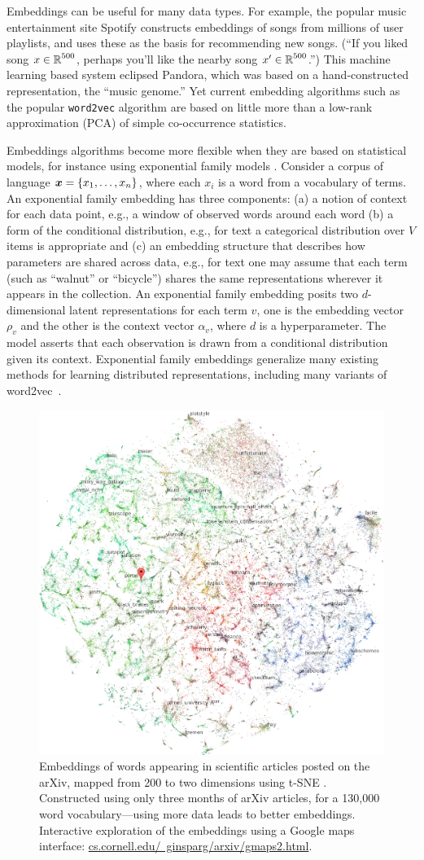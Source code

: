 Embeddings can be useful for many data types. For example, the popular
music entertainment site Spotify constructs embeddings of songs from
millions of user playlists, and uses these as the basis for
recommending new songs.  (``If you liked song $x\in\mbox{$\mathbb{R}$}^{500}$,
perhaps you'll like the nearby song $x'\in\mbox{$\mathbb{R}$}^{500}$.'')  This
machine learning based system eclipsed Pandora, which was based on a
hand-constructed representation, the ``music genome.'' Yet current
embedding algorithms such as the popular \texttt{word2vec} algorithm
are based on little more than a low-rank approximation (PCA) of simple
co-occurrence statistics.

Embeddings algorithms become more flexible when they are based
on statistical models, for instance using exponential family
models \citep{Rudolph:2016b,spherical}.
Consider a corpus of language $\boldsymbol{x} = \{x_1, \ldots, x_n\}$, where
each $x_i$ is a word from a vocabulary of terms. An exponential family
embedding has three components: (a) a notion of context for
each data point, e.g., a window of observed words around each word (b)
a form of the conditional distribution, e.g., for text a
categorical distribution over $V$ items is appropriate and (c) an
embedding structure that describes how parameters are shared
across data, e.g., for text one may assume that each term (such as
``walnut'' or ``bicycle'') shares the same representations wherever it
appears in the collection.
An exponential family embedding
posits two $d$-dimensional latent representations for each term $v$,
one is the embedding vector $\rho_v$ and the other is the
context vector $\alpha_v$, where $d$ is a hyperparameter.  The
model asserts that each observation is drawn from a conditional
distribution given its context. 
Exponential family embeddings generalize many existing methods for
learning distributed representations, including 
many variants of word2vec~\citep{Mikolov:2013}.  


\setlength{\columnsep}{20pt}
\begin{figure}
\centering
\includegraphics[width=.44\textwidth]{figs/ginsparg}
\caption{\small Embeddings of words appearing in scientific articles
posted on the arXiv, mapped from 200 to two dimensions using
t-SNE \citep{ginsparg}. Constructed using only three months of
arXiv articles, for a 130,000 word vocabulary---using more data
leads to better embeddings.
Interactive exploration of the embeddings
using a Google maps interface: \href{http://www.cs.cornell.edu/~ginsparg/arxiv/gmaps2.html}{cs.cornell.edu/~ginsparg/arxiv/gmaps2.html}.
}
    \label{fig:arxiv}
    \vskip2pt
\end{figure}

